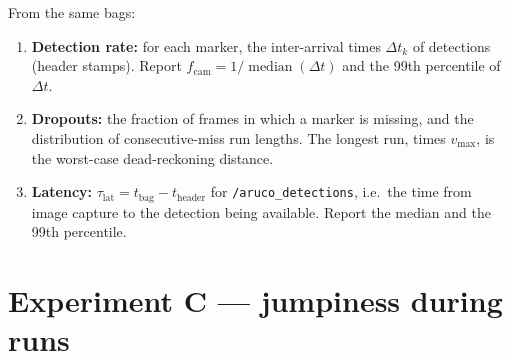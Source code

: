 \documentclass[11pt,a4paper]{article}
\begin{document}
From the same bags:
\begin{enumerate}[leftmargin=*]
\item \textbf{Detection rate:} for each marker, the inter-arrival times
      $\Delta t_k$ of detections (header stamps). Report
      $f_\text{cam}=1/\operatorname{median}(\Delta t)$ and the 99th
      percentile of $\Delta t$.
\item \textbf{Dropouts:} the fraction of frames in which a marker is
      missing, and the distribution of consecutive-miss run lengths. The
      longest run, times $v_\text{max}$, is the worst-case dead-reckoning
      distance.
\item \textbf{Latency:} $\tau_\text{lat}=t_\text{bag}-t_\text{header}$ for
      \texttt{/aruco\_detections}, i.e.\ the time from image capture to the
      detection being available. Report the median and the 99th percentile.
\end{enumerate}

\section{Experiment C --- jumpiness during runs}
\label{sec:jumps}
\end{document}
